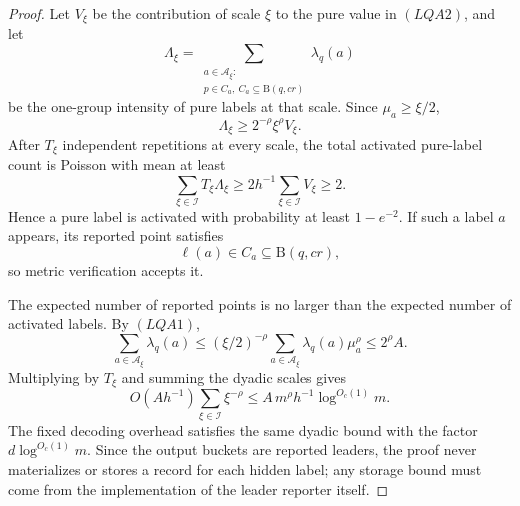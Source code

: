 \documentclass[10pt]{article}
\theoremstyle{definition}
\newcommand{\Ball}{\mathrm{B}}
\begin{document}
\begin{proof}
   Let \(V_\xi\) be the contribution of scale \(\xi\) to the pure value in
   \((LQA2)\), and let
   \[
      \Lambda_\xi
      =
      \sum_{\substack{a\in\mathcal A_\xi:\\
                      p\in C_a,\ C_a\subseteq\Ball(q,cr)}}
      \lambda_q(a)
   \]
   be the one-group intensity of pure labels at that scale.  Since
   \(\mu_a\ge\xi/2\),
   \[
      \Lambda_\xi\ge2^{-\rho}\xi^\rho V_\xi .
   \]
   After \(T_\xi\) independent repetitions at every scale, the total activated
   pure-label count is Poisson with mean at least
   \[
      \sum_{\xi\in\mathcal I}T_\xi\Lambda_\xi
      \ge
      2h^{-1}\sum_{\xi\in\mathcal I}V_\xi
      \ge2 .
   \]
   Hence a pure label is activated with probability at least \(1-e^{-2}\).  If
   such a label \(a\) appears, its reported point satisfies
   \[
      \ell(a)\in C_a\subseteq\Ball(q,cr),
   \]
   so metric verification accepts it.

   The expected number of reported points is no larger than the expected number
   of activated labels.  By \((LQA1)\),
   \[
      \sum_{a\in\mathcal A_\xi}\lambda_q(a)
      \le
      (\xi/2)^{-\rho}
      \sum_{a\in\mathcal A_\xi}\lambda_q(a)\mu_a^\rho
      \le
      2^\rho A .
   \]
   Multiplying by \(T_\xi\) and summing the dyadic scales gives
   \[
      O(Ah^{-1})\sum_{\xi\in\mathcal I}\xi^{-\rho}
      \le
      A\,m^\rho h^{-1}\log^{O_c(1)}m .
   \]
   The fixed decoding overhead satisfies the same dyadic bound with the factor
   \(d\log^{O_c(1)}m\).  Since the output buckets are reported leaders, the
   proof never materializes or stores a record for each hidden label; any
   storage bound must come from the implementation of the leader reporter
   itself.
\end{proof}
\end{document}
